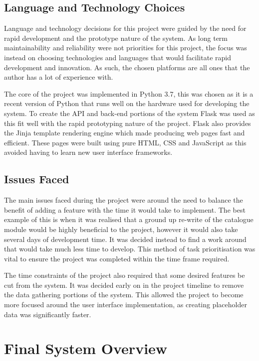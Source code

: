 \documentclass[12pt,titlepage]{article}
\begin{document}
  \subsection{Language and Technology Choices}

  Language and technology decisions for this project were guided by the need for
  rapid development and the prototype nature of the system. As long term
  maintainability and reliability were not priorities for this project, the
  focus was instead on choosing technologies and languages that would facilitate
  rapid development and innovation. As such, the chosen platforms are all ones
  that the author has a lot of experience with.

  The core of the project was implemented in Python 3.7, this was chosen as it
  is a recent version of Python that runs well on the hardware used for
  developing the system. To create the API and back-end portions of the system
  Flask was used as this fit well with the rapid prototyping nature of the
  project. Flask also provides the Jinja template rendering engine which made
  producing web pages fast and efficient. These pages were built using pure
  HTML, CSS and JavaScript as this avoided having to learn new user interface
  frameworks.

  \subsection{Issues Faced}

  The main issues faced during the project were around the need to balance the
  benefit of adding a feature with the time it would take to implement. The best
  example of this is when it was realised that a ground up re-write of the
  catalogue module would be highly beneficial to the project, however it would
  also take several days of development time. It was decided instead to find a
  work around that would take much less time to develop. This method of task
  prioritisation was vital to ensure the project was completed within the
  time frame required.

  The time constraints of the project also required that some desired features
  be cut from the system. It was decided early on in the project timeline to
  remove the data gathering portions of the system. This allowed the project to
  become more focused around the user interface implementation, as creating
  placeholder data was significantly faster.

\section{Final System Overview}
\end{document}
